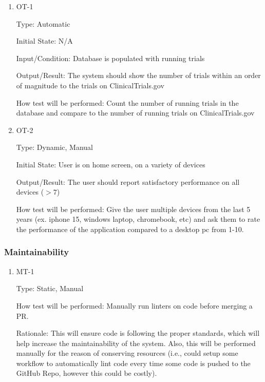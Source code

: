 \documentclass[12pt, titlepage]{article}
\begin{document}
\begin{enumerate}

\item{OT-1\\}

Type: Automatic
					
Initial State: N/A
					
Input/Condition: Database is populated with running trials
					
Output/Result: The system should show the number of trials within an order of magnitude to the trials on ClinicalTrials.gov
					
How test will be performed: Count the number of running trials in the database and compare to the number of 
running trials on ClinicalTrials.gov

\item{OT-2\\}

Type: Dynamic, Manual
					
Initial State: User is on home screen, on a variety of devices
					
Output/Result: The user should report satisfactory performance on all devices ($>7$)
					
How test will be performed: Give the user multiple devices from the last 5 years (ex. iphone 15, windows laptop, chromebook, etc)
and ask them to rate the performance of the application compared to a desktop pc from 1-10.

\end{enumerate}

\subsubsection{Maintainability}

\begin{enumerate}

\item{MT-1\\}

Type: Static, Manual
					
How test will be performed: Manually run linters on code before merging a PR.

Rationale: This will ensure code is following the proper standards, which will help increase the maintainability of the system.
Also, this will be performed manually for the reason of conserving resources (i.e., could setup some workflow to automatically lint 
code every time some code is pushed to the GitHub Repo, however this could be costly).

\end{enumerate}
\end{document}

